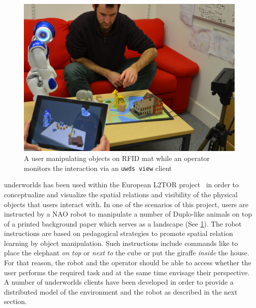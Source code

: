 \documentclass[letterpaper, 10 pt, conference]{ieeeconf}  %
\newcommand{\uwds}{{\sc underworlds}\xspace}
\begin{document}
\begin{figure}
    \centering
    \includegraphics[width=\linewidth]{l2tor-photo2}
    \caption{A user manipulating objects on RFID mat while an operator monitors the interaction via an {\tt uwds view} client}
    \label{fig|l2torexample}
\end{figure}
\uwds has been used within the European L2TOR project~\cite{belpaeme2015l2tor} in order to conceptualize and visualize the spatial relations and visibility of the physical objects that users interact with. In one of the scenarios of this project, users are instructed by a NAO robot to manipulate a number of Duplo-like animals on top of a printed background paper which serves as a landscape (See \ref{fig|l2torexample}). The robot instructions are based on pedagogical strategies to promote spatial relation learning by object manipulation. Such instructions include commands like to place the elephant \textit{on top} or \textit{next to} the cube or put the giraffe \textit{inside} the house.
For that reason, the robot and the operator should be able to access whether the user performs the required task and at the same time envisage their perspective. A number of \uwds clients have been developed in order to provide a distributed model of the environment and the robot as described in the next section.
\end{document}
